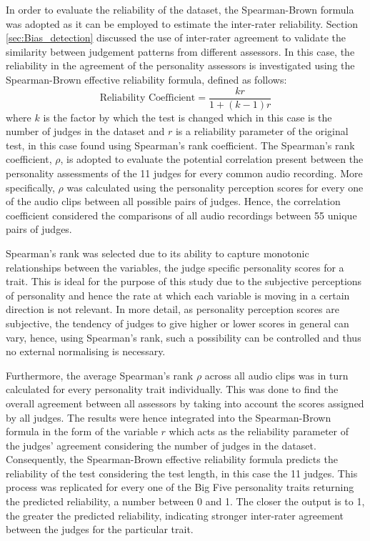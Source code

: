 \documentclass{l4proj}
\begin{document}
In order to evaluate the reliability of the dataset, the Spearman-Brown formula was adopted as it can be employed to estimate the inter-rater reliability. Section \ref{sec:Bias_detection} discussed the use of inter-rater agreement to validate the similarity between judgement patterns from different assessors. In this case, the reliability in the agreement of the personality assessors is investigated using the Spearman-Brown effective reliability formula, defined as follows:
\begin{equation}
\text{Reliability Coefficient} = \frac{kr}{1+(k-1)r}
\end{equation}
where $k$  is the factor by which the test is changed which in this case is the number of judges in the dataset and $r$ is a reliability parameter of the original test, in this case found using Spearman's rank coefficient.
The Spearman’s rank coefficient, $\rho$, is adopted to evaluate the potential correlation present between the personality assessments of the 11 judges for every common audio recording. More specifically, $\rho$ was calculated using the personality perception scores for every one of the audio clips between all possible pairs of judges. Hence, the correlation coefficient considered the comparisons of all audio recordings between 55 unique pairs of judges.

Spearman’s rank was selected due to its ability to capture monotonic relationships between the variables, the judge specific personality scores for a trait. This is ideal for the purpose of this study due to the subjective perceptions of personality and hence the rate at which each variable is moving in a certain direction is not relevant. In more detail, as personality perception scores are subjective, the tendency of judges to give higher or lower scores in general can vary, hence, using Spearman's rank, such a possibility can be controlled and thus no external normalising is necessary.

Furthermore, the average Spearman’s rank $\rho$ across all audio clips was in turn calculated for every personality trait individually. This was done to find the overall agreement between all assessors by taking into account the scores assigned by all judges. The results were hence integrated into the Spearman-Brown formula in the form of the variable $r$ which acts as the reliability parameter of the judges’ agreement considering the number of judges in the dataset. Consequently, the Spearman-Brown effective reliability formula predicts the reliability of the test considering the test length, in this case the 11 judges. This process was replicated for every one of the Big Five personality traits returning the predicted reliability, a number between 0 and 1. The closer the output is to 1, the greater the predicted reliability, indicating stronger inter-rater agreement between the judges for the particular trait.
\end{document}
